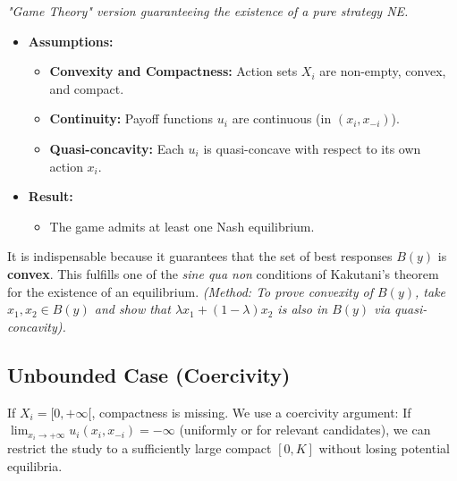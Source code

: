 \documentclass[10pt,a4paper]{article}
\begin{document}
\begin{tcolorbox}[colback=white, title=\textbf{3. Glicksberg's Theorem (Game Synthesis)}]
\textit{"Game Theory" version guaranteeing the existence of a pure strategy NE.}
\begin{itemize}
    \item \textbf{Assumptions:}
    \begin{itemize}
        \item \textbf{Convexity and Compactness:} Action sets $X_i$ are non-empty, convex, and compact.
        \item \textbf{Continuity:} Payoff functions $u_i$ are continuous (in $(x_i, x_{-i})$).
        \item \textbf{Quasi-concavity:} Each $u_i$ is quasi-concave with respect to its own action $x_i$.
    \end{itemize}
    \item \textbf{Result:}
    \begin{itemize}
        \item The game admits at least one Nash equilibrium.
    \end{itemize}
\end{itemize}
\end{tcolorbox}

\begin{tcolorbox}[colback=yellow!10, title=Why is quasi-concavity crucial?]
It is indispensable because it guarantees that the set of best responses $B(y)$ is \textbf{convex}.
This fulfills one of the \textit{sine qua non} conditions of Kakutani's theorem for the existence of an equilibrium.
\textit{(Method: To prove convexity of $B(y)$, take $x_1, x_2 \in B(y)$ and show that $\lambda x_1 + (1-\lambda)x_2$ is also in $B(y)$ via quasi-concavity).}
\end{tcolorbox}

\subsection{Unbounded Case (Coercivity)}
If $X_i = [0, +\infty[$, compactness is missing. We use a coercivity argument:
If $\lim_{x_i \to +\infty} u_i(x_i, x_{-i}) = -\infty$ (uniformly or for relevant candidates), we can restrict the study to a sufficiently large compact $[0, K]$ without losing potential equilibria.
\end{document}
